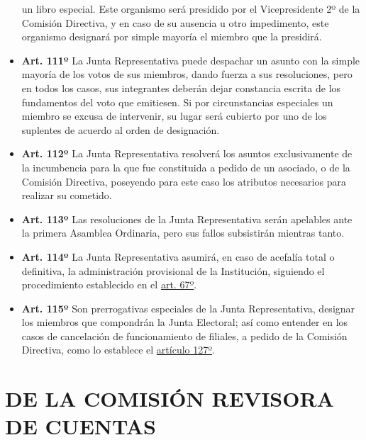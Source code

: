 \documentclass[]{book}
\begin{document}
\begin{itemize}
  un libro especial. Este organismo será presidido por el Vicepresidente
  2º de la Comisión Directiva, y en caso de su ausencia u otro
  impedimento, este organismo designará por simple mayoría el miembro
  que la presidirá.
\item
  \textbf{Art. 111º} La Junta Representativa puede despachar un asunto
  con la simple mayoría de los votos de sus miembros, dando fuerza a sus
  resoluciones, pero en todos los casos, sus integrantes deberán dejar
  constancia escrita de los fundamentos del voto que emitiesen. Si por
  circunstancias especiales un miembro se excusa de intervenir, su lugar
  será cubierto por uno de los suplentes de acuerdo al orden de
  designación.
\item
  \textbf{Art. 112º} La Junta Representativa resolverá los asuntos
  exclusivamente de la incumbencia para la que fue constituida a pedido
  de un asociado, o de la Comisión Directiva, poseyendo para este caso
  los atributos necesarios para realizar su cometido.
\item
  \textbf{Art. 113º} Las resoluciones de la Junta Representativa serán
  apelables ante la primera Asamblea Ordinaria, pero sus fallos
  subsistirán mientras tanto.
\item
  \textbf{Art. 114º} La Junta Representativa asumirá, en caso de
  acefalía total o definitiva, la administración provisional de la
  Institución, siguiendo el procedimiento establecido en el
  \protect\hyperlink{art67}{art. 67º}.
\item
  \textbf{Art. 115º} Son prerrogativas especiales de la Junta
  Representativa, designar los miembros que compondrán la Junta
  Electoral; así como entender en los casos de cancelación de
  funcionamiento de filiales, a pedido de la Comisión Directiva, como lo
  establece el \protect\hyperlink{art127}{artículo 127º}.
\end{itemize}

\chapter{DE LA COMISIÓN REVISORA DE
CUENTAS}\label{de-la-comision-revisora-de-cuentas}
\end{document}
